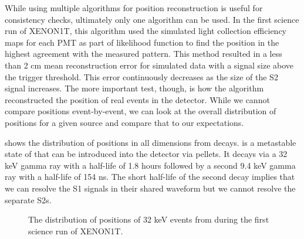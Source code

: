 While using multiple algorithms for position reconstruction is useful for consistency checks, ultimately only one algorithm can be used.  In the first science run of XENON1T, this algorithm used the simulated light collection efficiency maps for each PMT as part of likelihood function to find the position in the highest agreement with the measured pattern.  This method resulted in a less than 2 cm mean reconstruction error for simulated data with a signal size above the trigger threshold.  This error continuously decreases as the size of the S2 signal increases.  The more important test, though, is how the algorithm reconstructed the position of real events in the detector.  While we cannot compare positions event-by-event, we can look at the overall distribution of positions for a given source and compare that to our expectations.  

 shows the distribution of  positions in all dimensions from  decays.   is a metastable state of  that can be introduced into the detector via  pellets.  It decays via a 32 keV gamma ray with a half-life of 1.8 hours followed by a second 9.4 keV gamma ray with a half-life of 154 ns.  The short half-life of the second decay implies that we can resolve the S1 signals in their shared waveform but we cannot resolve the separate S2s.


\begin{figure}[t]
	\centering
	 \hfill
	\caption{The distribution of positions of 32 keV events from  during the first science run of XENON1T.}
	\label{fig:xe1t_pos_rec_kr}
\end{figure}


